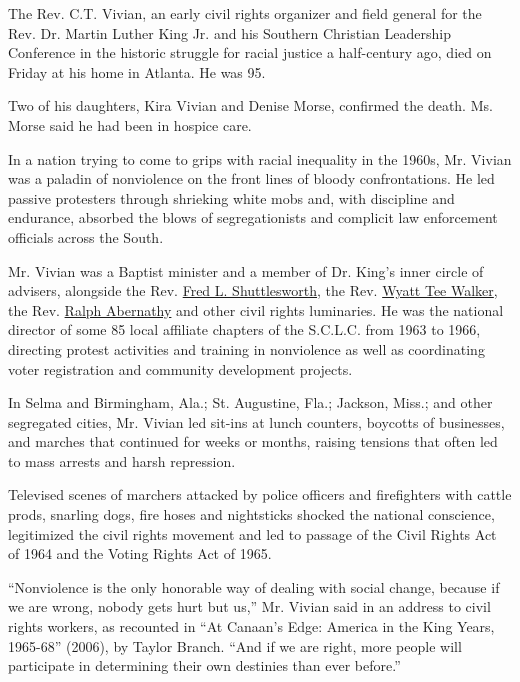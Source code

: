 The Rev. C.T. Vivian, an early civil rights organizer and field general
for the Rev. Dr. Martin Luther King Jr. and his Southern Christian
Leadership Conference in the historic struggle for racial justice a
half-century ago, died on Friday at his home in Atlanta. He was 95.

Two of his daughters, Kira Vivian and Denise Morse, confirmed the death.
Ms. Morse said he had been in hospice care.

In a nation trying to come to grips with racial inequality in the 1960s,
Mr. Vivian was a paladin of nonviolence on the front lines of bloody
confrontations. He led passive protesters through shrieking white mobs
and, with discipline and endurance, absorbed the blows of
segregationists and complicit law enforcement officials across the
South.

Mr. Vivian was a Baptist minister and a member of Dr. King's inner
circle of advisers, alongside the Rev.
\href{https://www.nytimes3xbfgragh.onion/2011/10/06/us/rev-fred-l-shuttlesworth-civil-rights-leader-dies-at-89.html\#:~:text=Shuttlesworth\%2C\%20a\%20storied\%20civil\%20rights,He\%20was\%2089.}{Fred
L. Shuttlesworth}, the Rev.
\href{https://www.nytimes3xbfgragh.onion/2018/01/23/obituaries/wyatt-tee-walker-dead.html}{Wyatt
Tee Walker}, the Rev.
\href{https://www.nytimes3xbfgragh.onion/1990/04/18/obituaries/ralph-david-abernathy-rights-pioneer-is-dead-at-64.html}{Ralph
Abernathy} and other civil rights luminaries. He was the national
director of some 85 local affiliate chapters of the S.C.L.C. from 1963
to 1966, directing protest activities and training in nonviolence as
well as coordinating voter registration and community development
projects.

In Selma and Birmingham, Ala.; St. Augustine, Fla.; Jackson, Miss.; and
other segregated cities, Mr. Vivian led sit-ins at lunch counters,
boycotts of businesses, and marches that continued for weeks or months,
raising tensions that often led to mass arrests and harsh repression.

Televised scenes of marchers attacked by police officers and
firefighters with cattle prods, snarling dogs, fire hoses and
nightsticks shocked the national conscience, legitimized the civil
rights movement and led to passage of the Civil Rights Act of 1964 and
the Voting Rights Act of 1965.

``Nonviolence is the only honorable way of dealing with social change,
because if we are wrong, nobody gets hurt but us,'' Mr. Vivian said in
an address to civil rights workers, as recounted in ``At Canaan's Edge:
America in the King Years, 1965-68'' (2006), by Taylor Branch. ``And if
we are right, more people will participate in determining their own
destinies than ever before.''

